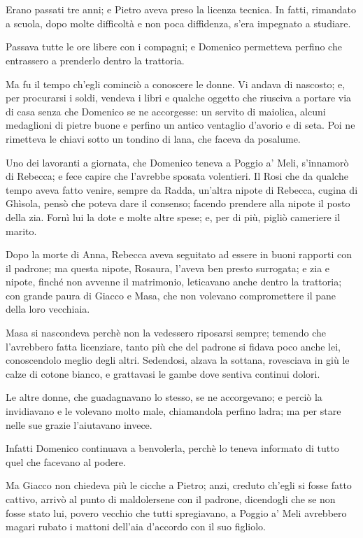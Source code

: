 \chapter{}

Erano passati tre anni; e Pietro aveva preso la licenza tecnica. In fatti, rimandato a scuola, dopo molte difficoltà e non poca diffidenza, s'era impegnato a studiare.

Passava tutte le ore libere con i compagni; e Domenico permetteva perfino che entrassero a prenderlo dentro la trattoria.

Ma fu il tempo ch'egli cominciò a conoscere le donne. Vi andava di nascosto; e, per procurarsi i soldi, vendeva i libri e qualche oggetto che riusciva a portare via di casa senza che Domenico se ne accorgesse: un servito di maiolica, alcuni medaglioni di pietre buone e perfino un antico ventaglio d'avorio e di seta. Poi ne rimetteva le chiavi sotto un tondino di lana, che faceva da posalume.

Uno dei lavoranti a giornata, che Domenico teneva a Poggio a' Meli, s'innamorò di Rebecca; e fece capire che l'avrebbe sposata volentieri. Il Rosi che da qualche tempo aveva fatto venire, sempre da Radda, un'altra nipote di Rebecca, cugina di Ghìsola, pensò che poteva dare il consenso; facendo prendere alla nipote il posto della zia. Fornì lui la dote e molte altre spese; e, per di più, pigliò cameriere il marito.

Dopo la morte di Anna, Rebecca aveva seguitato ad essere in buoni rapporti con il padrone; ma questa nipote, Rosaura, l'aveva ben presto surrogata; e zia e nipote, finché non avvenne il matrimonio, leticavano anche dentro la trattoria; con grande paura di Giacco e Masa, che non volevano compromettere il pane della loro vecchiaia.

Masa si nascondeva perchè non la vedessero riposarsi sempre; temendo che l'avrebbero fatta licenziare, tanto più che del padrone si fidava poco anche lei, conoscendolo meglio degli altri. Sedendosi, alzava la sottana, rovesciava in giù le calze di cotone bianco, e grattavasi le gambe dove sentiva continui dolori.

Le altre donne, che guadagnavano lo stesso, se ne accorgevano; e perciò la invidiavano e le volevano molto male, chiamandola perfino ladra; ma per stare nelle sue grazie l'aiutavano invece.

Infatti Domenico continuava a benvolerla, perchè lo teneva informato di tutto quel che facevano al podere.

Ma Giacco non chiedeva più le cicche a Pietro; anzi, creduto ch'egli si fosse fatto cattivo, arrivò al punto di maldolersene con il padrone, dicendogli che se non fosse stato lui, povero vecchio che tutti spregiavano, a Poggio a' Meli avrebbero magari rubato i mattoni dell'aia d'accordo con il suo figliolo.

